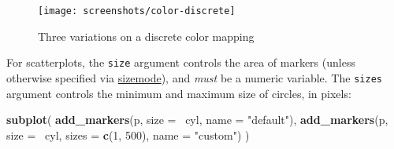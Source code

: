 \documentclass[12pt,]{isuthesis}
\newenvironment{Shaded}{\begin{snugshade}}{\end{snugshade}}
\newcommand{\KeywordTok}[1]{\textcolor[rgb]{0.13,0.29,0.53}{\textbf{{#1}}}}
\newcommand{\DataTypeTok}[1]{\textcolor[rgb]{0.13,0.29,0.53}{{#1}}}
\newcommand{\DecValTok}[1]{\textcolor[rgb]{0.00,0.00,0.81}{{#1}}}
\newcommand{\StringTok}[1]{\textcolor[rgb]{0.31,0.60,0.02}{{#1}}}
\newcommand{\OtherTok}[1]{\textcolor[rgb]{0.56,0.35,0.01}{{#1}}}
\newcommand{\NormalTok}[1]{{#1}}
\begin{document}
\begin{Shaded}
\end{Shaded}

\begin{figure}
\centering
\texttt{[image: screenshots/color-discrete]}
\caption{\label{fig:color-discrete}Three variations on a discrete color
mapping}
\end{figure}

For scatterplots, the \texttt{size} argument controls the area of
markers (unless otherwise specified via
\href{https://plot.ly/r/reference/\#scatter-marker-sizemode}{sizemode}),
and \emph{must} be a numeric variable. The \texttt{sizes} argument
controls the minimum and maximum size of circles, in pixels:

\begin{Shaded}
\begin{Highlighting}[]
\KeywordTok{subplot}\NormalTok{(}
  \KeywordTok{add_markers}\NormalTok{(p, }\DataTypeTok{size =} \NormalTok{~cyl, }\DataTypeTok{name =} \StringTok{"default"}\NormalTok{),}
  \KeywordTok{add_markers}\NormalTok{(p, }\DataTypeTok{size =} \NormalTok{~cyl, }\DataTypeTok{sizes =} \KeywordTok{c}\NormalTok{(}\DecValTok{1}\NormalTok{, }\DecValTok{500}\NormalTok{), }\DataTypeTok{name =} \StringTok{"custom"}\NormalTok{)}
\NormalTok{)}
\end{Highlighting}
\end{Shaded}
\end{document}
